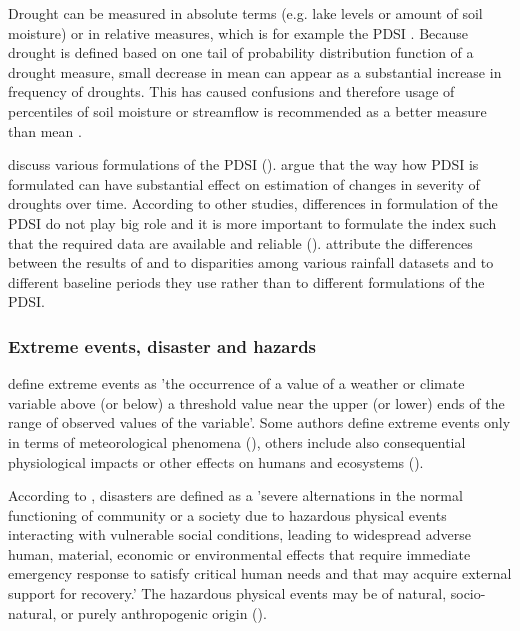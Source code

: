 \documentclass[a4paper,12pt]{article}
\begin{document}
Drought can be measured in absolute terms (e.g. lake levels or amount of soil moisture) or in relative measures, which is for example the  PDSI \citep{Trenberth2014}. Because drought is defined based on one tail of probability distribution function of a drought measure, small decrease in mean can appear as a substantial increase in frequency of droughts. This has caused confusions and therefore usage of percentiles of soil moisture or streamflow is recommended as a better measure than mean \citep{Trenberth2014}.





\cite{Trenberth2014} discuss various formulations of the PDSI (\citealt{Sheffield2012, Dai2011}).  \cite{Sheffield2012} argue that the way  how PDSI is formulated can have substantial effect on estimation of changes in severity of droughts over time. According to other studies, differences in formulation of the PDSI do not play big role and it is more important to formulate the index such that the required data are available and reliable (\citealp{Trenberth2014,vanderSchrier2011,Wang2012}). \cite{Trenberth2014} attribute the differences between the results of \cite{Sheffield2012} and \cite{Trenberth2014} to disparities among various rainfall datasets and to different baseline periods they use rather than to different formulations of the PDSI.   



\subsubsection*{Extreme events, disaster and hazards}
\cite{IPCC2012ch1} define extreme events as 'the occurrence of a value of a weather or climate variable above (or below) a threshold value near the upper (or lower) ends of the range of observed values of the variable'. Some authors define extreme events only in terms of meteorological phenomena (\citealp{easterling2000, Jentsch2007}), others include also consequential physiological impacts or other effects on humans and ecosystems (\citealp{IPCC2012ch1, young2002}).


According to \cite{IPCC2012ch1}, disasters are defined as a 'severe alternations in the normal functioning of community or a society due to hazardous physical events interacting with vulnerable social conditions, leading to widespread adverse human, material, economic or environmental effects that require immediate emergency response to satisfy critical human needs and that may acquire external support for recovery.' The hazardous physical events may be of natural, socio-natural, or purely anthropogenic origin (\citealp{IPCC2012ch1, wisner2004risk}).
\end{document}
